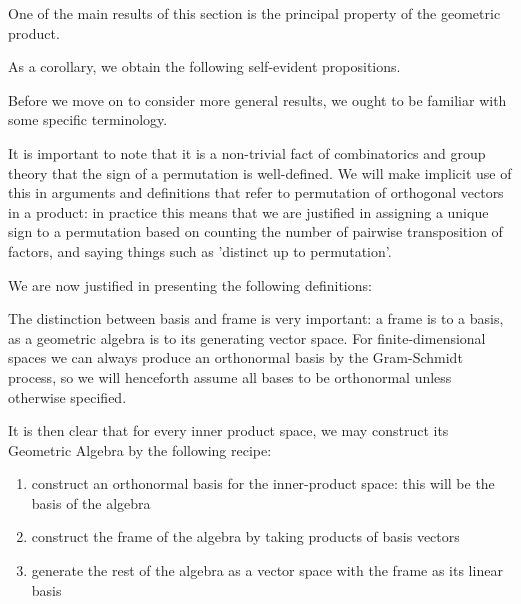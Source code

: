 One of the main results of this section is the principal property of the geometric product.



As a corollary, we obtain the following self-evident propositions.
%
%



Before we move on to consider more general results, we ought to be familiar with some specific terminology.


%
%



\begin{remark}
	It is important to note that it is a non-trivial fact of combinatorics and group theory that the sign of a permutation is well-defined. We will make implicit use of this in arguments and definitions that refer to permutation of orthogonal vectors in a product: in practice this means that we are justified in assigning a unique sign to a permutation based on counting the number of pairwise transposition of factors, and saying things such as 'distinct up to permutation'.
\end{remark}



We are now justified in presenting the following definitions:

%
%




The distinction between basis and frame is very important: a frame is to a basis, as a geometric algebra is to its generating vector space.
For finite-dimensional spaces we can always produce an orthonormal basis by the Gram-Schmidt process, so we will henceforth assume all bases to be orthonormal unless otherwise specified.

It is then clear that for every inner product space, we may construct its Geometric Algebra by the following recipe:
\begin{enumerate}
	\item construct an orthonormal basis for the inner-product space: this will be the basis of the algebra
	\item construct the frame of the algebra by taking products of basis vectors
	\item generate the rest of the algebra as a vector space with the frame as its linear basis
\end{enumerate}

